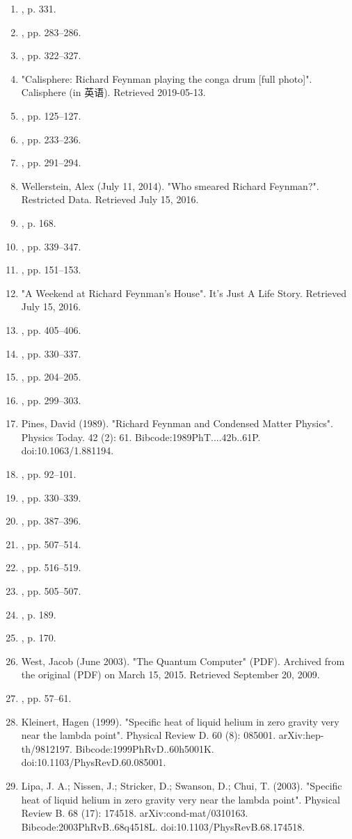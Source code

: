 \begin{enumerate}
\item , p. 331.
\item , pp. 283–286.
\item , pp. 322–327.
\item "Calisphere: Richard Feynman playing the conga drum [full photo]". Calisphere (in 英语). Retrieved 2019-05-13.
\item , pp. 125–127.
\item , pp. 233–236.
\item , pp. 291–294.
\item Wellerstein, Alex (July 11, 2014). "Who smeared Richard Feynman?". Restricted Data. Retrieved July 15, 2016.
\item , p. 168.
\item , pp. 339–347.
\item , pp. 151–153.
\item "A Weekend at Richard Feynman's House". It's Just A Life Story. Retrieved July 15, 2016.
\item , pp. 405–406.
\item , pp. 330–337.
\item , pp. 204–205.
\item , pp. 299–303.
\item Pines, David (1989). "Richard Feynman and Condensed Matter Physics". Physics Today. 42 (2): 61. Bibcode:1989PhT....42b..61P. doi:10.1063/1.881194.
\item , pp. 92–101.
\item , pp. 330–339.
\item , pp. 387–396.
\item , pp. 507–514.
\item , pp. 516–519.
\item , pp. 505–507.
\item , p. 189.
\item , p. 170.
\item West, Jacob (June 2003). "The Quantum Computer" (PDF). Archived from the original (PDF) on March 15, 2015. Retrieved September 20, 2009.
\item , pp. 57–61.
\item Kleinert, Hagen (1999). "Specific heat of liquid helium in zero gravity very near the lambda point". Physical Review D. 60 (8): 085001. arXiv:hep-th/9812197. Bibcode:1999PhRvD..60h5001K. doi:10.1103/PhysRevD.60.085001.
\item Lipa, J. A.; Nissen, J.; Stricker, D.; Swanson, D.; Chui, T. (2003). "Specific heat of liquid helium in zero gravity very near the lambda point". Physical Review B. 68 (17): 174518. arXiv:cond-mat/0310163. Bibcode:2003PhRvB..68q4518L. doi:10.1103/PhysRevB.68.174518.

\end{enumerate}
